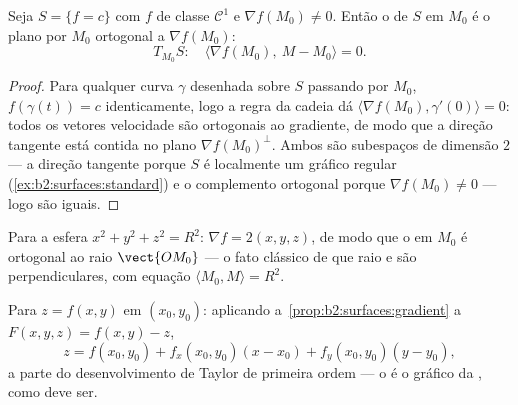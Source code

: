 \begin{proposition}\label{prop:b2:surfaces:gradient}
Seja $S = \{f = c\}$ com $f$ de classe $\mathcal{C}^1$ e $\nabla
f(M_0) \neq 0$. Então o  de $S$ em $M_0$ é o
plano por $M_0$ ortogonal a $\nabla f(M_0)$:
\[
T_{M_0}S :\quad
\langle \nabla f(M_0),\ M - M_0\rangle = 0 .
\]
\end{proposition}

\begin{proof}
Para qualquer curva $\gamma$ desenhada sobre $S$ passando por $M_0$, $f(\gamma(t)) =
c$ identicamente, logo a regra da cadeia dá $\langle
\nabla f(M_0), \gamma'(0)\rangle = 0$: todos os vetores velocidade são
ortogonais ao gradiente, de modo que a direção tangente está contida
no plano $\nabla f(M_0)^\perp$. Ambos são subespaços de
dimensão $2$ --- a direção tangente porque $S$ é localmente um
gráfico regular (\cref{ex:b2:surfaces:standard}) e o complemento
ortogonal porque $\nabla f(M_0) \neq 0$ --- logo são
iguais.
\end{proof}

\begin{example}\label{ex:b2:surfaces:spheretangent}
Para a esfera $x^2 + y^2 + z^2 = R^2$: $\nabla f = 2(x, y, z)$,
de modo que o  em $M_0$ é ortogonal ao raio
$\vect{OM_0}$ --- o fato clássico de que raio e 
são perpendiculares, com equação $\langle M_0, M\rangle = R^2$.
\end{example}

\begin{example}\label{ex:b2:surfaces:graphtangent}
Para $z = f(x, y)$ em $(x_0, y_0)$: aplicando
a~\cref{prop:b2:surfaces:gradient} a $F(x,y,z) = f(x,y) - z$,
\[
z = f(x_0, y_0)
+ f_x(x_0, y_0)(x - x_0)
+ f_y(x_0, y_0)(y - y_0) ,
\]
a parte  do desenvolvimento de Taylor de primeira ordem --- o
 é o gráfico da , como deve ser.
\end{example}

